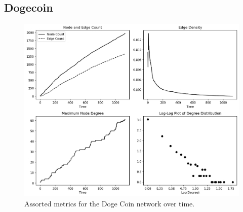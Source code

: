 \documentclass[a4paper,11pt]{article}
\begin{document}
\subsection{Dogecoin}
\begin{figure}[h!]
    \includegraphics[width=1.\linewidth]{Images/DogeCoin/graph_data.png}
    \centering
    \caption{Assorted metrics for the Doge Coin network over time.}
\end{figure}
\end{document}
